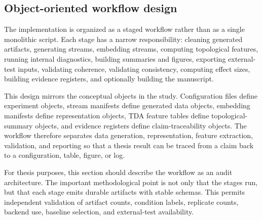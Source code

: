 
\subsection{Object-oriented workflow design}
\label{subsec:object-oriented-workflow}

The implementation is organized as a staged workflow rather than as a single monolithic script. Each stage has a narrow responsibility: cleaning generated artifacts, generating streams, embedding streams, computing topological features, running internal diagnostics, building summaries and figures, exporting external-test inputs, validating coherence, validating consistency, computing effect sizes, building evidence registers, and optionally building the manuscript.

This design mirrors the conceptual objects in the study. Configuration files define experiment objects, stream manifests define generated data objects, embedding manifests define representation objects, TDA feature tables define topological-summary objects, and evidence registers define claim-traceability objects. The workflow therefore separates data generation, representation, feature extraction, validation, and reporting so that a thesis result can be traced from a claim back to a configuration, table, figure, or log.

For thesis purposes, this section should describe the workflow as an audit architecture. The important methodological point is not only that the stages run, but that each stage emits durable artifacts with stable schemas. This permits independent validation of artifact counts, condition labels, replicate counts, backend use, baseline selection, and external-test availability.
